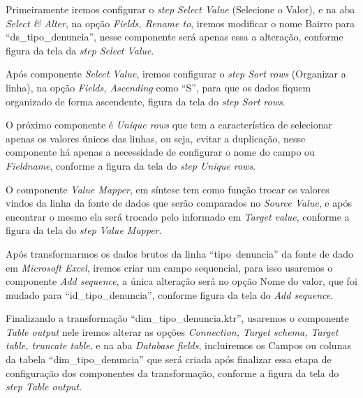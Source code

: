 Primeiramente iremos configurar o \textit{step Select Value} (Selecione o Valor), e na aba \textit{Select & Alter}, na op\c{c}\~{a}o \textit{Fields, Rename to}, iremos modificar o nome Bairro para ``ds\_tipo\_denuncia'', nesse componente ser\'{a} apenas essa a altera\c{c}\~{a}o, conforme figura da tela da \textit{step Select Value}.

Ap\'os  componente \textit{Select Value}, iremos configurar o \textit{step Sort rows} (Organizar a linha), na op\c{c}\~{a}o \textit{Fields, Ascending} como ``S'', para que os dados fiquem organizado de forma ascendente, figura da tela do \textit{step Sort rows}.

O pr\'oximo componente \'{e} \textit{Unique rows} que tem a caracter\'{i}stica de selecionar apenas os valores únicos das linhas, ou seja, evitar a duplica\c{c}\~{a}o, nesse componente h\'{a} apenas a necessidade de configurar o nome do campo ou \textit{Fieldname}, conforme a figura da tela do \textit{step Unique rows}.

O componente \textit{Value Mapper}, em s\'{i}ntese tem como fun\c{c}\~{a}o trocar os valores vindos da linha da fonte de dados que ser\~{a}o comparados no \textit{Source Value}, e ap\'os encontrar o mesmo ela ser\'{a} trocado pelo informado em \textit{Target value}, conforme a figura da tela do \textit{step Value Mapper}.

Ap\'os transformarmos os dados brutos da linha ``tipo\ denuncia'' da fonte de dado em \textit{Microsoft Excel}, iremos criar um campo sequencial, para isso usaremos o componente \textit{Add sequence}, a única altera\c{c}\~{a}o ser\'{a} no op\c{c}\~{a}o Nome do valor, que foi mudado para ``id\_tipo\_denuncia'', conforme figura da tela do \textit{Add sequence}.

Finalizando a transforma\c{c}\~{a}o ``dim\_tipo\_denuncia.ktr'', usaremos o componente \textit{Table output} nele iremos alterar as op\c{c}\~{o}es \textit{Connection, Target schema, Target table, truncate table}, e na aba \textit{Database fields}, incluiremos os Campos ou colunas da tabela ``dim\_tipo\_denuncia'' que ser\'{a} criada ap\'os finalizar essa etapa de configura\c{c}\~{a}o dos componentes da transforma\c{c}\~{a}o, conforme a figura da tela do \textit{step Table output}.

